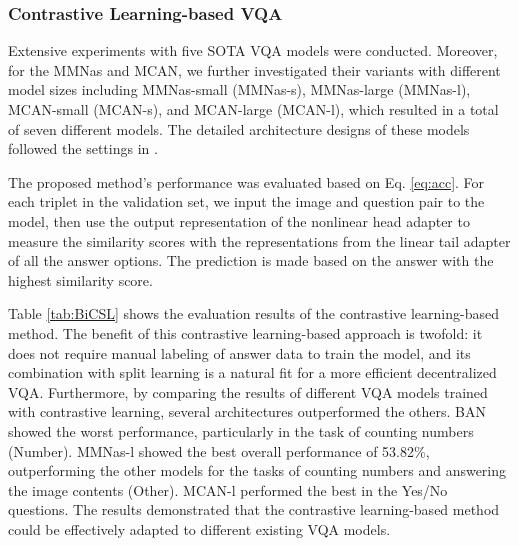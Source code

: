 \documentclass[letterpaper]{article} %
\begin{document}

\subsubsection{Contrastive Learning-based VQA}

Extensive experiments with five SOTA VQA models were conducted. Moreover, for the MMNas and MCAN, we further investigated their variants with different model sizes including MMNas-small (MMNas-s), MMNas-large (MMNas-l), MCAN-small (MCAN-s), and MCAN-large (MCAN-l), which resulted in a total of seven different models. The detailed architecture designs of these models followed the settings in \cite{mcan,mmnas}. 

The proposed method's performance was evaluated based on Eq. \ref{eq:acc}. For each triplet in the validation set, we input the image and question pair to the model, then use the output representation of the nonlinear head adapter to measure the similarity scores with the representations from the linear tail adapter of all the answer options. The prediction is made based on the answer with the highest similarity score. 

Table \ref{tab:BiCSL} shows the evaluation results of the contrastive learning-based method. The benefit of this contrastive learning-based approach is twofold: it does not require manual labeling of answer data to train the model, and its combination with split learning is a natural fit for a more efficient decentralized VQA. Furthermore, by comparing the results of different VQA models trained with contrastive learning, several architectures outperformed the others. BAN showed the worst performance, particularly in the task of counting numbers (Number). MMNas-l showed the best overall performance of 53.82\%, outperforming the other models for the tasks of counting numbers and answering the image contents (Other). MCAN-l performed the best in the Yes/No questions. The results demonstrated that the contrastive learning-based method could be effectively adapted to different existing VQA models.
\end{document}
